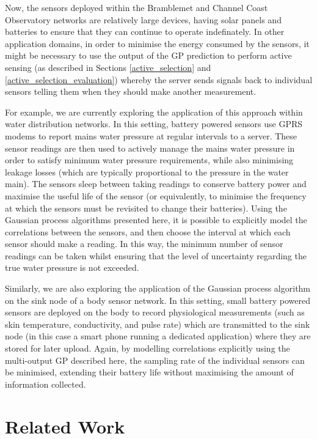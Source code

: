 \documentclass{acmsmall}
\begin{document}
Now, the sensors deployed within the Bramblemet and Channel Coast Observatory networks are relatively large devices, having solar panels and batteries to ensure that they can continue to operate indefinately. In other application domains, in order to minimise the energy consumed by the sensors, it might be necessary to use the output of the GP prediction to perform active sensing (as described in Sections \ref{active_selection} and \ref{active_selection_evaluation}) whereby the server sends signals back to individual sensors telling them when they should make another measurement. 

For example, we are currently exploring the application of this approach within water distribution networks. In this setting, battery powered sensors use GPRS modems to report mains water pressure at regular intervals to a server. These sensor readings are then used to actively manage the mains water pressure in order to satisfy minimum water pressure requirements, while also minimising leakage losses (which are typically proportional to the pressure in the water main). The sensors sleep between taking readings to conserve battery power and maximise the useful life of the sensor (or equivalently, to minimise the frequency at which the sensors must be revisited to change their batteries). Using the Gaussian process algorithms presented here, it is possible to explicitly model the correlations between the sensors, and then choose the interval at which each sensor should make a reading. In this way, the minimum number of sensor readings can be taken whilst ensuring that the level of uncertainty regarding the true water pressure is not exceeded.


Similarly, we are also exploring the application of the Gaussian process algorithm on the sink node of a body sensor network. In this setting, small battery powered sensors are deployed on the body to record physiological measurements (such as skin temperature, conductivity, and pulse rate) which are transmitted to the sink node (in this case a smart phone running a dedicated application) where they are stored for later upload. Again, by modelling correlations explicitly using the multi-output GP described here, the sampling rate of the individual sensors can be minimised, extending their battery life without maximising the amount of information collected.

\section{Related Work}\label{sec_related}
\end{document}
